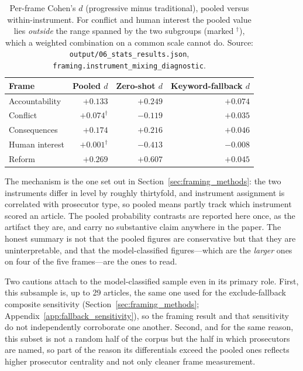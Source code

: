 \documentclass[12pt, letterpaper]{article}
\begin{document}
\begin{table}[ht]
\centering
\caption{Per-frame Cohen's $d$ (progressive minus traditional), pooled versus within-instrument. For conflict and human interest the pooled value lies \emph{outside} the range spanned by the two subgroups (marked $^{\dagger}$), which a weighted combination on a common scale cannot do. Source: \texttt{output/06\_stats\_results.json}, \texttt{framing.instrument\_mixing\_diagnostic}.}
\label{tab:instrument_mixing}
\begin{tabular}{lrrr}
\toprule
Frame & Pooled $d$ & Zero-shot $d$ & Keyword-fallback $d$ \\
\midrule
Accountability & $+0.133$ & $+0.249$ & $+0.074$ \\
Conflict       & $+0.074^{\dagger}$ & $-0.119$ & $+0.035$ \\
Consequences   & $+0.174$ & $+0.216$ & $+0.046$ \\
Human interest & $+0.001^{\dagger}$ & $-0.413$ & $-0.008$ \\
Reform         & $+0.269$ & $+0.607$ & $+0.045$ \\
\bottomrule
\end{tabular}
\end{table}

The mechanism is the one set out in Section~\ref{sec:framing_methods}: the two instruments differ in level by roughly thirtyfold, and instrument assignment is correlated with prosecutor type, so pooled means partly track which instrument scored an article. The pooled probability contrasts are reported here once, as the artifact they are, and carry no substantive claim anywhere in the paper. The honest summary is not that the pooled figures are conservative but that they are uninterpretable, and that the model-classified figures---which are the \emph{larger} ones on four of the five frames---are the ones to read.

Two cautions attach to the model-classified sample even in its primary role. First, this subsample is, up to 29 articles, the same one used for the exclude-fallback composite sensitivity (Section~\ref{sec:framing_methods}; Appendix~\ref{app:fallback_sensitivity}), so the framing result and that sensitivity do not independently corroborate one another. Second, and for the same reason, this subset is not a random half of the corpus but the half in which prosecutors are named, so part of the reason its differentials exceed the pooled ones reflects higher prosecutor centrality and not only cleaner frame measurement.
\end{document}
